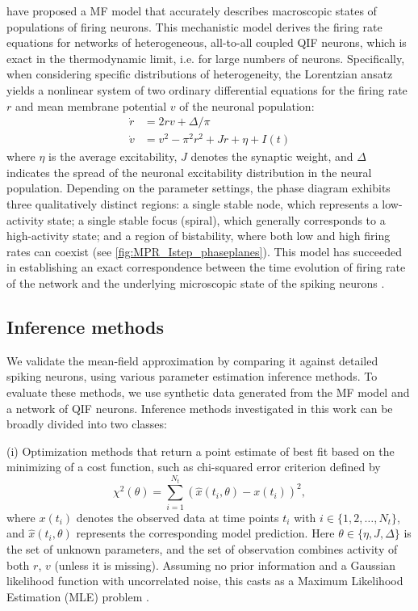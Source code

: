 \documentclass[preprint,11pt,authoryear]{elsarticle}
\begin{document}
\cite{Montbrio_Pazo_Roxin} have proposed a MF model that accurately describes macroscopic states of populations of firing neurons. This mechanistic model derives the firing rate equations for networks of heterogeneous, all-to-all coupled QIF neurons, which is exact in the thermodynamic limit, i.e. for large numbers of neurons. Specifically, when considering specific distributions of heterogeneity, the Lorentzian ansatz yields a nonlinear system of two ordinary differential equations for the firing rate $r$ and mean membrane potential $v$ of the neuronal population:
\begin{subequations}
\begin{align}
    \dot{r} &= 2 r v +\Delta/\pi  \label{eq:mpr_r} \\
    \dot{v} &= v^2 - \pi^2 r^2 + J r + \eta+ I(t) \label{eq:mpr_v}
\end{align}
\label{eq:mpr}
\end{subequations}
where $\eta$ is the average excitability, $J$ denotes the synaptic weight, and $\Delta$ indicates the spread of the neuronal excitability distribution in the neural population. Depending on the parameter settings, the phase diagram exhibits three qualitatively distinct regions: a single stable node, which represents a low-activity state; a single stable focus (spiral), which generally corresponds to a high-activity state; and a region of bistability, where both low and high firing rates can coexist (see \autoref{fig:MPR_Istep_phaseplanes}). This model has succeeded in establishing an exact correspondence between the time evolution of firing rate of the network and the underlying microscopic state of the spiking neurons \citep{Montbrio_Pazo_Roxin}.

  


\subsection{Inference methods}

We validate the mean-field approximation by comparing it against detailed spiking neurons, using various parameter estimation inference methods. To evaluate these methods, we use synthetic data generated from the MF model and a network of QIF neurons.
Inference methods investigated in this work can be broadly divided into two classes:

(i) Optimization methods that return a point estimate of best fit based on the minimizing of a cost function, such as chi-squared error criterion defined by 
\begin{equation}
\label{eq:khi}
{\chi^2}({\theta})= \sum\limits_{i=1}^{N_t} \left({\hat x}(t_i, \theta)-{x}(t_i)\right)^2,
\end{equation}
where $x(t_{i})$ denotes the observed data at time points $t_i$ with $ i \in \{1, 2, \dots, N_t\}$, and ${\hat x}(t_i,{ \theta})$ represents the corresponding model prediction. Here $\theta \in \{ \eta, J, \Delta \}$ is the set of unknown parameters, and the set of observation combines activity of both $r$, $v$ (unless it is missing). Assuming no prior information and a Gaussian likelihood function with uncorrelated noise, this casts as a Maximum Likelihood Estimation (MLE) problem \citep{Hashemi2018}.
\end{document}
